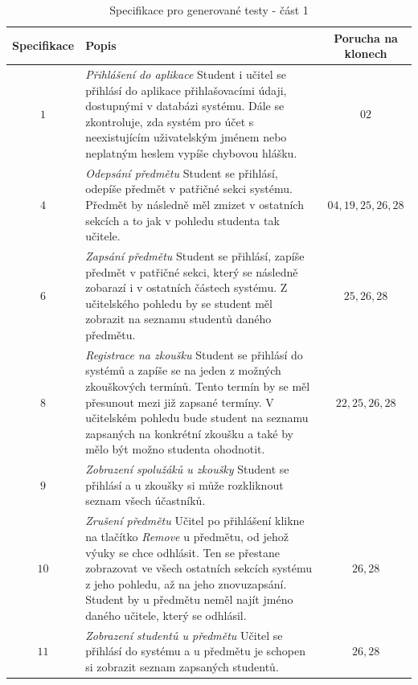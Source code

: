 \documentclass[czech, ma, kiv, he, iso690numb, pdf, viewonly]{fasthesis}
\begin{document}
    \begin{table}
        \begin{tabular}{|c|p{7cm}|c|}
            \hline
            \textbf{Specifikace} & \textbf{Popis} & \textbf{Porucha na klonech} \\
            \hline
            \(1\) & \textit{Přihlášení do aplikace} \newline Student i učitel se přihlásí do aplikace přihlašovacími údaji, dostupnými v databázi systému. Dále se zkontroluje, zda systém pro účet s neexistujícím uživatelským jménem nebo neplatným heslem vypíše chybovou hlášku. &  \(02\) \\
            \hline
            \(4\) & \textit{Odepsání předmětu} \newline Student se přihlásí, odepíše předmět v patřičné sekci systému. Předmět by následně měl zmizet v ostatních sekcích a to jak v pohledu studenta tak učitele. & \(04, 19, 25, 26, 28\) \\
            \hline
            \(6\) & \textit{Zapsání předmětu} \newline Student se přihlásí, zapíše předmět v patřičné sekci, který se následně zobarazí i v ostatních částech systému. Z učitelského pohledu by se student měl zobrazit na seznamu studentů daného předmětu. & \(25, 26, 28\) \\
            \hline
            \(8\) & \textit{Registrace na zkoušku} \newline Student se přihlásí do systémů a zapíše se na jeden z možných zkouškových termínů. Tento termín by se měl přesunout mezi již zapsané termíny. V učitelském pohledu bude student na seznamu zapsaných na konkrétní zkoušku a také by mělo být možno studenta ohodnotit. & \(22, 25, 26, 28\) \\
            \hline
            \(9\) & \textit{Zobrazení spolužáků u zkoušky} \newline Student se přihlásí a u zkoušky si může rozkliknout seznam všech účastníků. & \(\) \\
            \hline
            \(10\) & \textit{Zrušení předmětu} \newline Učitel po přihlášení klikne na tlačítko \textit{Remove} u předmětu, od jehož výuky se chce odhlásit. Ten se přestane zobrazovat ve všech ostatních sekcích systému z jeho pohledu, až na jeho znovuzapsání. Student by u předmětu neměl najít jméno daného učitele, který se odhlásil. & \(26, 28\) \\
            \hline
            \(11\) & \textit{Zobrazení studentů u předmětu} \newline Učitel se přihlásí do systému a u předmětu je schopen si zobrazit seznam zapsaných studentů. & \(26, 28\) \\
            \hline
        \end{tabular}
        \centering
        \label{tab:specs_1}
        \caption{Specifikace pro generované testy - část 1}
    \end{table}
\end{document}
